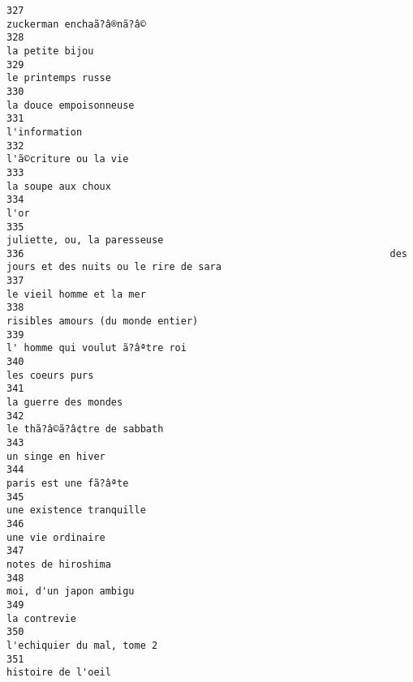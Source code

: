 \documentclass[
]{report}
\begin{document}
\begin{verbatim}
327                                                                                zuckerman enchaã?â®nã?â©
328                                                                                         la petite bijou
329                                                                                      le printemps russe
330                                                                                  la douce empoisonneuse
331                                                                                           l'information
332                                                                                   l'ã©criture ou la vie
333                                                                                      la soupe aux choux
334                                                                                                    l'or
335                                                                             juliette, ou, la paresseuse
336                                                               des jours et des nuits ou le rire de sara
337                                                                                le vieil homme et la mer
338                                                                       risibles amours (du monde entier)
339                                                                         l' homme qui voulut ã?âªtre roi
340                                                                                         les coeurs purs
341                                                                                    la guerre des mondes
342                                                                             le thã?â©ã?â¢tre de sabbath
343                                                                                       un singe en hiver
344                                                                                   paris est une fã?âªte
345                                                                                une existence tranquille
346                                                                                       une vie ordinaire
347                                                                                      notes de hiroshima
348                                                                                  moi, d'un japon ambigu
349                                                                                            la contrevie
350                                                                              l'echiquier du mal, tome 2
351                                                                                      histoire de l'oeil

\end{verbatim}
\end{document}

